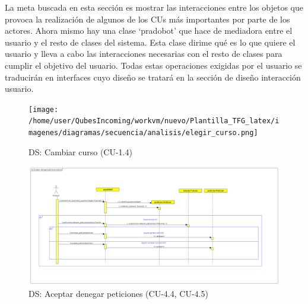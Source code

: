 La meta buscada en esta sección es mostrar las interacciones entre los objetos que provoca la realización de algunos de los CUs más importantes por parte de los actores. Ahora mismo hay una clase \enquote*{pradobot} que hace de mediadora entre el usuario y el resto de clases del sistema. Esta clase dirime qué es lo que quiere el usuario y lleva a cabo las interacciones necesarias con el resto de clases para cumplir el objetivo del usuario. Todas estas operaciones exigidas por el usuario se traducirán en interfaces cuyo diseño se tratará en la sección de diseño interacción usuario.


\begin{figure}[H] %
\centering
\texttt{[image: /home/user/QubesIncoming/workvm/nuevo/Plantilla\_TFG\_latex/imagenes/diagramas/secuencia/analisis/elegir\_curso.png]}  %

\caption{DS: Cambiar curso (CU-1.4) }\label{figura62}

\end{figure}

\begin{figure}[H] %
\centering
\includegraphics[scale=0.2]{imagenes/diagramas/secuencia/analisis/aceptar_denegar_peticion.png}  %

\caption{DS: Aceptar denegar peticiones (CU-4.4, CU-4.5) }\label{figura72}

\end{figure}

